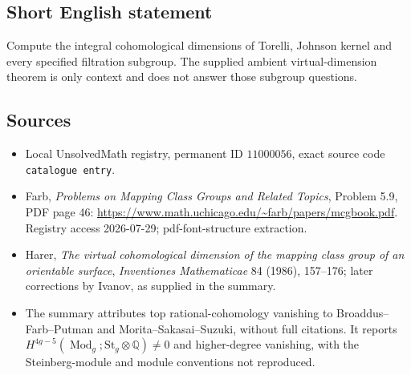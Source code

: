 \documentclass[11pt]{article}
\newcommand{\Q}{\mathbb{Q}}
\begin{document}
\subsection{Short English statement}
Compute the integral cohomological dimensions of Torelli, Johnson kernel and every specified filtration subgroup. The supplied ambient virtual-dimension theorem is only context and does not answer those subgroup questions.
\subsection{Sources}
\begin{itemize}
\item Local UnsolvedMath registry, permanent ID \(11000056\), exact source code \texttt{catalogue entry}.
\item Farb, \emph{Problems on Mapping Class Groups and Related Topics}, Problem 5.9, PDF page 46: \url{https://www.math.uchicago.edu/~farb/papers/mcgbook.pdf}. Registry access 2026-07-29; pdf-font-structure extraction.
\item Harer, \emph{The virtual cohomological dimension of the mapping class group of an orientable surface}, \emph{Inventiones Mathematicae} 84 (1986), 157--176; later corrections by Ivanov, as supplied in the summary.
\item The summary attributes top rational-cohomology vanishing to Broaddus--Farb--Putman and Morita--Sakasai--Suzuki, without full citations. It reports \(H^{4g-5}(\operatorname{Mod}_g;\mathrm{St}_g\otimes\Q)\ne0\) and higher-degree vanishing, with the Steinberg-module and module conventions not reproduced.
\end{itemize}
\end{document}
